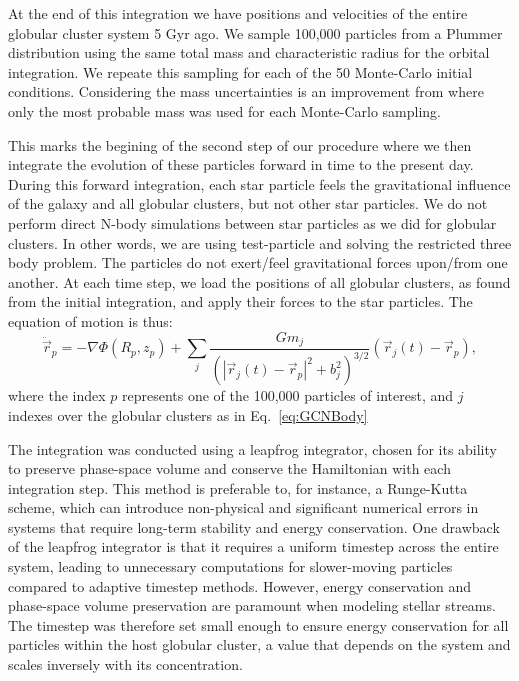 \documentclass{aa}
\begin{document}
    At the end of this integration we have positions and velocities of the entire globular cluster system 5 Gyr ago. We sample 100,000 particles from a Plummer distribution using the same total mass and characteristic radius for the orbital integration. We repeate this sampling for each of the 50 Monte-Carlo initial conditions. Considering the mass uncertainties is an improvement from \citet{2023A&A...673A..44F} where only the most probable mass was used for each Monte-Carlo sampling. 


    This marks the begining of the second step of our procedure where we then integrate the evolution of these particles forward in time to the present day. During this forward integration, each star particle feels the gravitational influence of the galaxy and all globular clusters, but not other star particles. We do not perform direct N-body simulations between star particles as we did for globular clusters. In other words, we are using test-particle and solving the restricted three body problem. The particles do not exert/feel gravitational forces upon/from one another. At each time step, we load the positions of all globular clusters, as found from the initial integration, and apply their forces to the star particles. The equation of motion is thus: 
    \begin{equation}
      \ddot{\vec{r}}_p = -\nabla \Phi(R_p,z_p) + \left.\sum_{j} \frac{Gm_j}{\left(|\vec{r}_j(t) - \vec{r}_p|^2 + b_j^2\right)^{3/2}}\right. \left(\vec{r}_j(t)- \vec{r}_p\right),
      \end{equation} \label{eq:equation_of_motion_particle} where the index $p$ represents one of the 100,000 particles of interest, and $j$ indexes over the globular clusters as in Eq.~\ref{eq:GCNBody}

    The integration was conducted using a leapfrog integrator, chosen for its ability to preserve phase-space volume and conserve the Hamiltonian with each integration step. This method is preferable to, for instance, a Runge-Kutta scheme, which can introduce non-physical and significant numerical errors in systems that require long-term stability and energy conservation. One drawback of the leapfrog integrator is that it requires a uniform timestep across the entire system, leading to unnecessary computations for slower-moving particles compared to adaptive timestep methods. However, energy conservation and phase-space volume preservation are paramount when modeling stellar streams. The timestep was therefore set small enough to ensure energy conservation for all particles within the host globular cluster, a value that depends on the system and scales inversely with its concentration.
\end{document}
